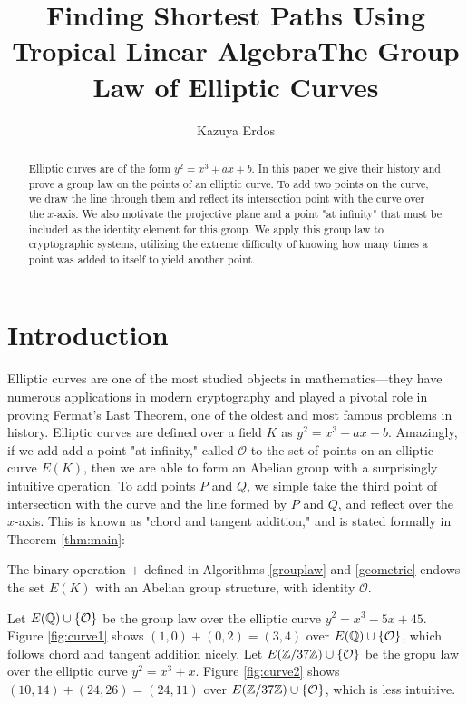 \documentclass[]{math_paper}
\title{Finding Shortest Paths Using Tropical Linear Algebra}
\author{Kazuya Erdos}
\title{The Group Law of Elliptic Curves}
\begin{document}
\maketitle

\begin{abstract}
    Elliptic curves are of the form $y^2 = x^3 + ax + b$. In this paper we give their history and prove a group law on the points of an elliptic curve. To add two points on the curve, we draw the line through them and reflect its intersection point with the curve over the $x$-axis. We also motivate the projective plane and a point "at infinity" that must be included as the identity element for this group. We apply this group law to cryptographic systems, utilizing the extreme difficulty of knowing how many times a point was added to itself to yield another point.
\end{abstract}
\section{Introduction}
Elliptic curves are one of the most studied objects in mathematics---they have numerous applications in modern cryptography and played a pivotal role in proving Fermat's Last Theorem, one of the oldest and most famous problems in history. Elliptic curves are defined over a field $K$ as $y^2 = x^3 + ax + b$. Amazingly, if we add add a point "at infinity," called $\mathcal{O}$ to the set of points on an elliptic curve $E(K)$, then we are able to form an Abelian group with a surprisingly intuitive operation. To add points $P$ and $Q$, we simple take the third point of intersection with the curve and the line formed by $P$ and $Q$, and reflect over the $x$-axis. This is known as "chord and tangent addition," and is stated formally in Theorem \ref{thm:main}:

\begin{maintheorema}
    The binary operation $+$ defined in Algorithms \ref{grouplaw} and \ref{geometric} endows the set $E(K)$ with an Abelian group structure, with identity $\mathcal{O}$.
\end{maintheorema}

\begin{example}
    Let $E(\mathbb{Q}) \cup \{\mathcal{O}\}$ be the group law over the elliptic curve $y^2 = x^3 - 5x + 45$. Figure \ref{fig:curve1} shows $(1, 0) + (0, 2) = (3, 4)$ over $E(\mathbb{Q}) \cup \{\mathcal{O}\}$, which follows chord and tangent addition nicely. Let $E(\mathbb{Z}/37\mathbb{Z}) \cup \{\mathcal{O}\}$ be the gropu law over the elliptic curve $y^2 = x^3 + x$. Figure \ref{fig:curve2} shows $(10, 14) + (24, 26) = (24, 11)$ over $E(\mathbb{Z}/37\mathbb{Z}) \cup \{\mathcal{O}\}$, which is less intuitive.
\end{example}
\end{document}
